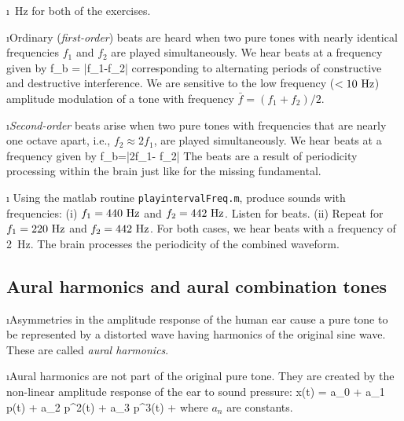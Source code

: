 \i {}~Hz for both of the exercises.

\i Ordinary ({\em first-order}) beats are heard when
two pure tones with nearly identical frequencies
$f_1$ and $f_2$ are played simultaneously.
We hear beats at a frequency given by
%
\be
f_b = |f_1-f_2|
\ee
%
corresponding to alternating
periods of constructive and destructive interference.
We are sensitive to the low frequency
($<10~{\rm Hz}$)  amplitude modulation of a tone with 
frequency $\bar f = (f_1+f_2)/2$.

\i {\em Second-order} beats arise when two pure tones 
with frequencies that are nearly one octave apart, 
i.e., $f_2\approx 2f_1$, are played simultaneously.
We hear beats at a frequency given by 
%
\be
f_b=|2f_1- f_2|
\ee
%
The beats are a result of periodicity processing 
within the brain just like for the missing fundamental.

\i \demo 
Using the matlab routine {\tt playintervalFreq.m}, 
produce sounds with frequencies: 
(i) $f_1=440~{\rm Hz}$ and $f_2=442~{\rm Hz}$.
Listen for beats.
(ii) Repeat for $f_1=220~{\rm Hz}$ and $f_2=442~{\rm Hz}$.
For both cases, we hear beats with a frequency of 2~Hz.
The brain processes the periodicity of the combined waveform.


\ei
\subsection{Aural harmonics and aural combination tones}
\bi

\i Asymmetries in the amplitude response of the 
human ear cause a pure tone to be represented
by a distorted wave having harmonics of the 
original sine wave.
These are called {\em aural harmonics}.

\i Aural harmonics are not part of the original
pure tone.
They are created by the non-linear 
amplitude response of the ear to sound pressure:
%
\be
x(t) = a_0 + a_1 p(t) + a_2 p^2(t) + a_3 p^3(t) + \cdots
\label{e:nonlinear}
\ee
%
where $a_n$ are constants.

